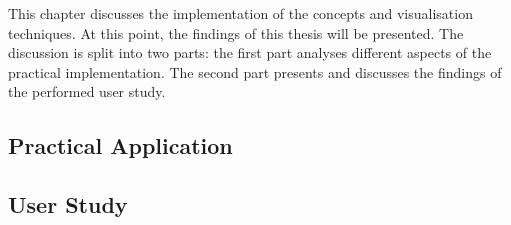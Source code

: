 This chapter discusses the implementation of the concepts and visualisation techniques. At this point, the findings of this thesis will be presented. The discussion is split into two parts: the first part analyses different aspects of the practical implementation. The second part presents and discusses the findings of the performed user study.

\subsection{Practical Application}


\subsection{User Study}
